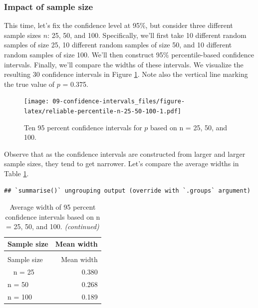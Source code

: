 \documentclass[
]{book}
\begin{document}
\hypertarget{impact-of-sample-size}{%
\subsubsection*{Impact of sample size}\label{impact-of-sample-size}}

This time, let's fix the confidence level at 95\%, but consider three different sample sizes \(n\): 25, 50, and 100. Specifically, we'll first take 10 different random samples of size 25, 10 different random samples of size 50, and 10 different random samples of size 100. We'll then construct 95\% percentile-based confidence intervals. Finally, we'll compare the widths of these intervals. We visualize the resulting 30 confidence intervals in Figure \ref{fig:reliable-percentile-n-25-50-100}. Note also the vertical line marking the true value of \(p\) = 0.375.

\begin{figure}
\centering
\texttt{[image: 09-confidence-intervals\_files/figure-latex/reliable-percentile-n-25-50-100-1.pdf]}
\caption{\label{fig:reliable-percentile-n-25-50-100}Ten 95 percent confidence intervals for \(p\) based on n = 25, 50, and 100.}
\end{figure}

Observe that as the confidence intervals are constructed from larger and larger sample sizes, they tend to get narrower. Let's compare the average widths in Table \ref{tab:perc-cis-average-width-2}.

\begin{verbatim}
## `summarise()` ungrouping output (override with `.groups` argument)
\end{verbatim}

\begingroup\fontsize{10}{12}\selectfont

\begin{longtable}[t]{lr}
\caption{\label{tab:perc-cis-average-width-2}Average width of 95 percent confidence intervals based on n = 25, 50, and 100.}\\
\toprule
Sample size & Mean width\\
\midrule
\endfirsthead
\caption[]{\label{tab:perc-cis-average-width-2}Average width of 95 percent confidence intervals based on n = 25, 50, and 100. \textit{(continued)}}\\
\toprule
Sample size & Mean width\\
\midrule
\endhead
\
\endfoot
\bottomrule
\endlastfoot
n = 25 & 0.380\\
n = 50 & 0.268\\
n = 100 & 0.189\\*
\end{longtable}
\endgroup{}
\end{document}
